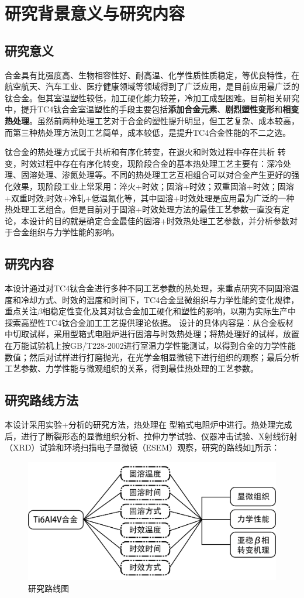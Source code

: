 \section{研究背景意义与研究内容}
\subsection{研究意义}
\ti 合金具有比强度高、生物相容性好、耐高温、化学性质性质稳定，等优良特性，在航空航天、汽车工业、医疗健康领域等领域得到了广泛应用，是目前应用最广泛的钛合金。但其室温塑性较低，加工硬化能力较差，冷加工成型困难。目前相关研究中，提升TC4钛合金室温塑性的手段主要包括\textbf{添加合金元素}、\textbf{剧烈塑性变形}和\textbf{相变热处理}。虽然前两种处理工艺对于合金的塑性提升明显，但工艺复杂、成本较高\cite{miao}，而第三种热处理方法则工艺简单，成本较低，是提升TC4合金性能的不二之选。

钛合金的热处理方式属于共析和有序化转变，在退火和时效过程中存在共析 转变，时效过程中存在有序化转变，现阶段\ti 合金的基本热处理工艺主要有：深冷处理、固溶处理、渗氮处理等。不同的热处理工艺互相组合可以对合金产生更好的强化效果，现阶段工业上常采用\cite{zhoukaixiangJiyushenlengchulidenanjiagongcailiaoqiexiaotexingyanjiu2022}：淬火+时效；固溶+时效；双重固溶+时效；固溶+双重时效;时效+冷轧+低温氮化等，其中固溶+时效处理是应用最为广泛的一种热处理工艺组合。但是目前对于固溶+时效处理方法的最佳工艺参数一直没有定论，本设计的目的就是确定\ti 合金最佳的固溶+时效热处理工艺参数，并分析参数对于合金组织与力学性能的影响。

\subsection{研究内容}
本设计通过对TC4钛合金进行多种不同工艺参数的热处理，来重点研究不同固溶温度和冷却方式、时效的温度和时间下，TC4合金显微组织与力学性能的变化规律，重点关注$ \beta  $相稳定性变化及其对钛合金加工硬化和塑性的影响，以期为实际生产中探索高塑性TC4钛合金加工工艺提供理论依据。
设计的具体内容是：从\ti 合金板材中切取试样，采用型箱式电阻炉进行固溶与时效热处理；将热处理好的试样，放置在万能试验机上按{GB/T228-2002}进行室温力学性能测试，以得到合金的力学性能数值；然后对试样进行打磨抛光，在光学金相显微镜下进行组织的观察；最后分析工艺参数、力学性能与微观组织的关系，得到最佳热处理的工艺参数。
\subsection{研究路线方法}
本设计采用实验+分析的研究方法，热处理在%
型箱式电阻炉中进行。热处理完成后，进行了断裂形态的显微组织分析、拉伸力学试验、仪器冲击试验、X射线衍射（XRD）试验和环境扫描电子显微镜（ESEM）观察，研究的路线如\ref{fig:roadmap}所示：

\begin{figure}[h!]
	\centering
	\includegraphics[width=0.8\linewidth]{pic/路线图}
	\caption{研究路线图}
	\label{fig:roadmap}
\end{figure}
